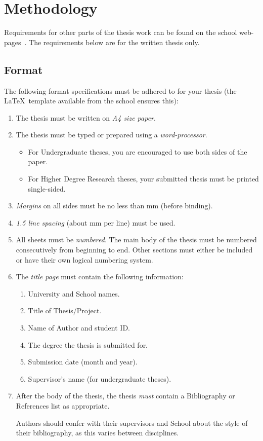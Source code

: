 \chapter{Methodology}\label{ch:style}

Requirements for other parts of the thesis work can be found on the school
web-pages~\cite{Noo05}.  The requirements below are for the written thesis
only.

\section{Format}
The following format specifications must be adhered to for your thesis
(the \LaTeX\ template available from the school ensures this):
\begin{enumerate}
\item The thesis must be written on \emph{A4 size paper}.
\item The thesis must be typed or prepared using a \emph{word-processor}.
\begin{itemize}
\item For Undergraduate theses, you are encouraged to use both sides
  of the paper.
\item For Higher Degree Research theses, your submitted thesis must be
   printed single-sided.
\end{itemize}
\item \emph{Margins} on all sides must be no less than \unit[20]{mm} (before
binding).
\item \emph{1.5 line spacing} (about \unit[8]{mm} per line) must be used.
\item All sheets must be \emph{numbered}. The main body of the thesis must be
numbered consecutively from beginning to end.  Other sections must either
be included or have their own logical numbering system.
\item The \emph{title page} must contain the following information:
\begin{enumerate}
\item University and School names.
\item Title of Thesis/Project.
\item Name of Author and student ID.
\item The degree the thesis is submitted for.
\item Submission date (month and year).
\item Supervisor's name (for undergraduate theses).
\end{enumerate}
\item After the body of the thesis, the thesis \emph{must} contain a
  Bibliography or References list as appropriate.

Authors should confer with their supervisors and School about the
style of their bibliography, as this varies between disciplines.
\end{enumerate}

